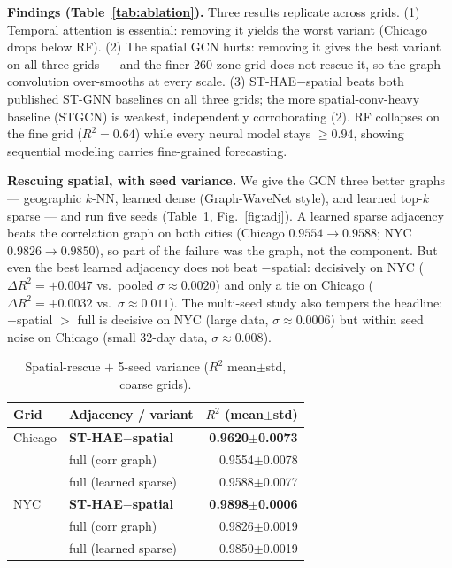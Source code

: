 \documentclass[sigconf, review, nonacm]{acmart}
\begin{document}
\textbf{Findings (Table~\ref{tab:ablation}).} Three results replicate across grids. (1) Temporal
attention is essential: removing it yields the worst variant (Chicago drops below RF). (2) The spatial
GCN hurts: removing it gives the best variant on all three grids --- and the finer 260-zone grid does
not rescue it, so the graph convolution over-smooths at every scale. (3) ST-HAE$-$spatial beats both
published ST-GNN baselines on all three grids; the more spatial-conv-heavy baseline (STGCN) is weakest,
independently corroborating (2). RF collapses on the fine grid ($R^2{=}0.64$) while every neural model
stays $\geq0.94$, showing sequential modeling carries fine-grained forecasting.

\textbf{Rescuing spatial, with seed variance.} We give the GCN three better graphs --- geographic
$k$-NN, learned dense (Graph-WaveNet style), and learned top-$k$ sparse --- and run five seeds
(Table~\ref{tab:adj}, Fig.~\ref{fig:adj}). A learned sparse adjacency beats the correlation graph on
both cities (Chicago $0.9554{\rightarrow}0.9588$; NYC $0.9826{\rightarrow}0.9850$), so part of the
failure was the graph, not the component. But even the best learned adjacency does not beat
$-$spatial: decisively on NYC ($\Delta R^2{=}{+}0.0047$ vs.\ pooled $\sigma{\approx}0.0020$) and only a
tie on Chicago ($\Delta R^2{=}{+}0.0032$ vs.\ $\sigma{\approx}0.011$). The multi-seed study also
tempers the headline: $-$spatial $>$ full is decisive on NYC (large data, $\sigma{\approx}0.0006$) but
within seed noise on Chicago (small 32-day data, $\sigma{\approx}0.008$).

\begin{table}[t]
  \caption{Spatial-rescue $+$ 5-seed variance ($R^2$ mean$\pm$std, coarse grids).}
  \label{tab:adj}
  \small
  \begin{tabular}{llr}
    \toprule
    Grid & Adjacency / variant & $R^2$ (mean$\pm$std) \\
    \midrule
    Chicago & \textbf{ST-HAE$-$spatial} & \textbf{0.9620$\pm$0.0073} \\
     & full (corr graph) & 0.9554$\pm$0.0078 \\
     & full (learned sparse) & 0.9588$\pm$0.0077 \\
    \midrule
    NYC & \textbf{ST-HAE$-$spatial} & \textbf{0.9898$\pm$0.0006} \\
     & full (corr graph) & 0.9826$\pm$0.0019 \\
     & full (learned sparse) & 0.9850$\pm$0.0019 \\
    \bottomrule
  \end{tabular}
\end{table}
\end{document}
